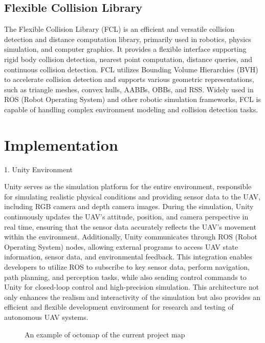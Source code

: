 \documentclass{article}
\begin{document}
\subsection{Flexible Collision Library}
The Flexible Collision Library (FCL) is an efficient and versatile collision detection and distance computation library, primarily used in robotics, physics simulation, and computer graphics. It provides a flexible interface supporting rigid body collision detection, nearest point computation, distance queries, and continuous collision detection. FCL utilizes Bounding Volume Hierarchies (BVH) to accelerate collision detection and supports various geometric representations, such as triangle meshes, convex hulls, AABBs, OBBs, and RSS. Widely used in ROS (Robot Operating System) and other robotic simulation frameworks, FCL is capable of handling complex environment modeling and collision detection tasks.

\section{Implementation}

1. Unity Environment

Unity serves as the simulation platform for the entire environment, responsible for simulating realistic physical conditions and providing sensor data to the UAV, including RGB camera and depth camera images. During the simulation, Unity continuously updates the UAV's attitude, position, and camera perspective in real time, ensuring that the sensor data accurately reflects the UAV’s movement within the environment. Additionally, Unity communicates through ROS (Robot Operating System) nodes, allowing external programs to access UAV state information, sensor data, and environmental feedback. This integration enables developers to utilize ROS to subscribe to key sensor data, perform navigation, path planning, and perception tasks, while also sending control commands to Unity for closed-loop control and high-precision simulation. This architecture not only enhances the realism and interactivity of the simulation but also provides an efficient and flexible development environment for research and testing of autonomous UAV systems.
\begin{figure}[h]
    \centering
    \caption{An example of octomap of the current project map}
    \label{fig:two_images}
\end{figure}
\end{document}
